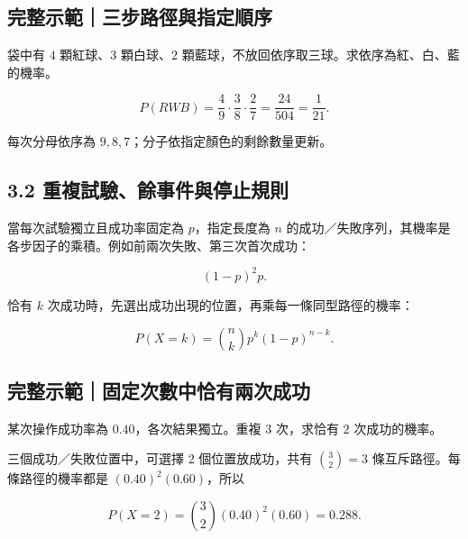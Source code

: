 \documentclass[11pt,a4paper]{article}
\begin{document}
\begin{HandoutWorkedExample}

\subsection{完整示範｜三步路徑與指定順序}\label{ux5b8cux6574ux793aux7bc4ux4e09ux6b65ux8defux5f91ux8207ux6307ux5b9aux9806ux5e8f}

袋中有 \(4\) 顆紅球、\(3\) 顆白球、\(2\) 顆藍球，不放回依序取三球。求依序為紅、白、藍的機率。

\[
P(RWB)
=\frac49\cdot\frac38\cdot\frac27
=\frac{24}{504}
=\boxed{\frac1{21}}.
\]

每次分母依序為 \(9,8,7\)；分子依指定顏色的剩餘數量更新。

\end{HandoutWorkedExample}

\subsection{3.2 重複試驗、餘事件與停止規則}\label{ux91cdux8907ux8a66ux9a57ux9918ux4e8bux4ef6ux8207ux505cux6b62ux898fux5247}

當每次試驗獨立且成功率固定為 \(p\)，指定長度為 \(n\) 的成功／失敗序列，其機率是各步因子的乘積。例如前兩次失敗、第三次首次成功：

\[
(1-p)^2p.
\]

恰有 \(k\) 次成功時，先選出成功出現的位置，再乘每一條同型路徑的機率：

\[
P(X=k)=\binom nk p^k(1-p)^{n-k}.
\]

\begin{HandoutWorkedExample}

\subsection{完整示範｜固定次數中恰有兩次成功}\label{ux5b8cux6574ux793aux7bc4ux56faux5b9aux6b21ux6578ux4e2dux6070ux6709ux5169ux6b21ux6210ux529f}

某次操作成功率為 \(0.40\)，各次結果獨立。重複 \(3\) 次，求恰有 \(2\) 次成功的機率。

三個成功／失敗位置中，可選擇 \(2\) 個位置放成功，共有 \(\binom32=3\) 條互斥路徑。每條路徑的機率都是 \((0.40)^2(0.60)\)，所以

\[
P(X=2)=\binom32(0.40)^2(0.60)=\boxed{0.288}.
\]

\end{HandoutWorkedExample}
\end{document}
